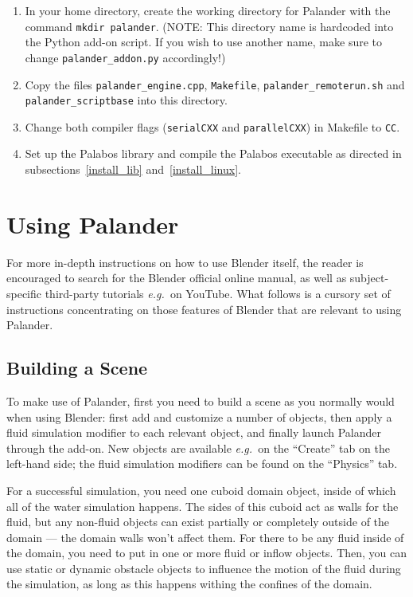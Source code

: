 \documentclass[12pt]{article}
\newcommand{\eg}{\emph{e.g.\ }}
\begin{document}
\begin{enumerate}

\item In your home directory, create the working directory for Palander with the command \verb|mkdir palander|. 
(NOTE: This directory name is hardcoded into the Python add-on script. If you wish to use another name, make 
sure to change \verb|palander_addon.py| accordingly!)
\item Copy the files \verb|palander_engine.cpp|, \verb|Makefile|, \verb|palander_remoterun.sh| and 
\verb|palander_scriptbase| into this directory.
\item Change both compiler flags (\verb|serialCXX| and \verb|parallelCXX|) in Makefile to \verb|CC|.
\item Set up the Palabos library and compile the Palabos executable as directed in 
subsections~\ref{install_lib} and~\ref{install_linux}.
\end{enumerate}

\newpage

\section{Using Palander}

For more in-depth instructions on how to use Blender itself, the reader is encouraged to search for the 
Blender official online manual, as well as subject-specific third-party tutorials \eg on YouTube. What 
follows is a cursory set of instructions concentrating on those features of Blender that are relevant to 
using Palander.

\subsection{Building a Scene}

To make use of Palander, first you need to build a scene as you normally would when using Blender: first add 
and customize a number of objects, then apply a fluid simulation modifier to each relevant object, and 
finally launch Palander through the add-on. New objects are available \eg on the ``Create'' tab on the 
left-hand side; the fluid simulation modifiers can be found on the ``Physics'' tab.

For a successful simulation, you need one cuboid domain object, inside of which all of the water simulation 
happens. The sides of this cuboid act as walls for the fluid, but any non-fluid objects can exist partially 
or completely outside of the domain --- the domain walls won't affect them. For there to be any fluid inside 
of the domain, you need to put in one or more fluid or inflow objects. Then, you can use static or dynamic 
obstacle objects to influence the motion of the fluid during the simulation, as long as this happens withing 
the confines of the domain.
\end{document}
